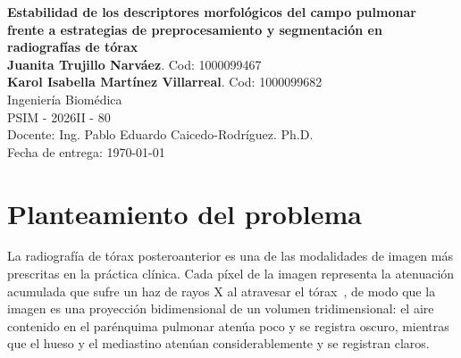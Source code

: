 \documentclass[12pt,a4paper]{article}
\newcommand{\tituloTrabajo}{Estabilidad de los descriptores morfológicos del campo pulmonar frente a estrategias de preprocesamiento y segmentación en radiografías de tórax}
\newcommand{\autorA}{Juanita Trujillo Narváez}
\newcommand{\autorB}{Karol Isabella Martínez Villarreal}
\newcommand{\carrera}{Ingeniería Biomédica}
\newcommand{\codigoEstudianteA}{1000099467}
\newcommand{\codigoEstudianteB}{1000099682}
\newcommand{\cursoCodigo}{PSIM - 2026II - 80}
\newcommand{\cursoNombre}{Procesamiento de Señales e Imágenes Médicas}
\newcommand{\docente}{Ing. Pablo Eduardo Caicedo-Rodríguez. Ph.D.}
\newcommand{\fechaEntrega}{\today}
\begin{document}
\thispagestyle{empty}
\begin{titlepage}
    \centering
    {\LARGE \textbf{\tituloTrabajo} \\
    }
    \vspace{2cm}
    {\large \textbf{\autorA}. Cod: \codigoEstudianteA} \\
    {\large \textbf{\autorB}. Cod: \codigoEstudianteB} \\
    \vspace{1cm}
    {\large \carrera} \\
    \vspace{0.5cm}
    {\large \cursoCodigo{}} \\
    Docente: \docente \\
    \vfill
    Fecha de entrega: \fechaEntrega
\end{titlepage}

\tableofcontents
\newpage

\begin{abstract}
    Este documento presenta la formulación del proyecto semestral del curso
    \cursoNombre{}. Se define el problema de la inestabilidad de los descriptores
    morfológicos del campo pulmonar en radiografías de tórax posteroanteriores
    frente a distintas estrategias de preprocesamiento y segmentación, se
    plantea la pregunta de investigación y los objetivos asociados, se documenta
    la selección del conjunto de datos entre cuatro candidatos evaluados, se traza
    la cobertura de los bloques técnicos de la asignatura, se define el cronograma
    de quince semanas con sus riesgos y mitigaciones, y se describe la estructura
    reproducible del proyecto.
\end{abstract}

\newpage

\section{Planteamiento del problema}

La radiografía de tórax posteroanterior es una de las modalidades de imagen más
prescritas en la práctica clínica. Cada píxel de la imagen representa la
atenuación acumulada que sufre un haz de rayos X al atravesar el tórax~\cite{prince2015}, de modo
que la imagen es una proyección bidimensional de un volumen tridimensional: el
aire contenido en el parénquima pulmonar atenúa poco y se registra oscuro,
mientras que el hueso y el mediastino atenúan considerablemente y se registran
claros.
\end{document}
